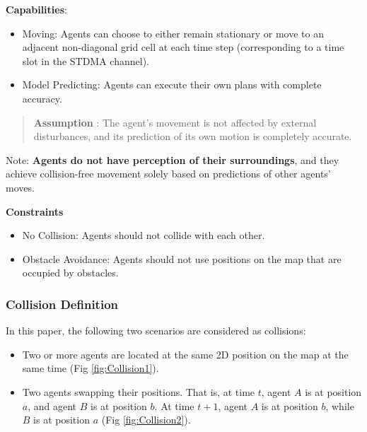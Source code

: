 \textbf{Capabilities}:
\begin{itemize}
    \item Moving: Agents can choose to either remain stationary or move to an adjacent non-diagonal grid cell at each time step (corresponding to a time slot in the STDMA channel).
    \item Model Predicting: Agents can execute their own plans with complete accuracy.
\end{itemize}

\begin{quotation}
    \textbf{Assumption }:  
    The agent's movement is not affected by external disturbances, and its prediction of its own motion is completely accurate.
\end{quotation}

Note: \textbf{Agents do not have perception of their surroundings}, and they achieve collision-free movement solely based on predictions of other agents' moves.



\textbf{Constraints}

\begin{itemize}
    \item No Collision: Agents should not collide with each other.
    \item Obstacle Avoidance: Agents should not use positions on the map that are occupied by obstacles.
\end{itemize}

\subsubsection{Collision Definition}

In this paper, the following two scenarios are considered as collisions:
\begin{itemize}
    \item Two or more agents are located at the same 2D position on the map at the same time (Fig \ref{fig:Collision1}).
    \item Two agents swapping their positions. That is, at time $t$, agent $A$ is at position $a$, and agent $B$ is at position $b$. At time $t+1$, agent $A$ is at position $b$, while $B$ is at position $a$ (Fig \ref{fig:Collision2}).
\end{itemize}

